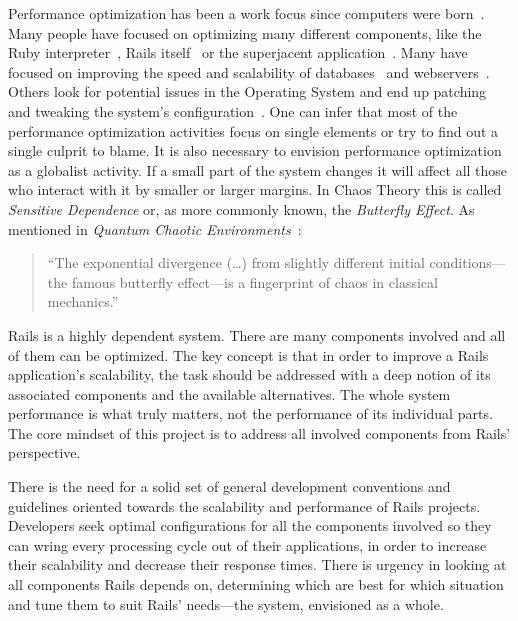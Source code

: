 Performance optimization has been a work focus since computers were born~\cite{mass_memory_system_optimization}. Many people have focused on optimizing many different components, like the Ruby interpreter~\cite{yarv}, Rails itself~\cite{rails_merb_merge_performance} or the superjacent application~\cite{scaling_rails_bottomup,vaporware_to_awesome,rebuilding_scaling_yellowpages,5tips_scale_ror}. Many have focused on improving the speed and scalability of databases~\cite{performance_analysis_db_arch} and webservers~\cite{webserver_scheduling}. Others look for potential issues in the Operating System and end up patching and tweaking the system's configuration~\cite{unix_os_comparison, architecture_impact_os}. One can infer that most of the performance optimization activities focus on single elements or try to find out a single culprit to blame. It is also necessary to envision performance optimization as a globalist activity. If a small part of the system changes it will affect all those who interact with it by smaller or larger margins. In Chaos Theory this is called \textit{Sensitive Dependence} or, as more commonly known, the \textit{Butterfly Effect}. As mentioned in \textit{Quantum Chaotic Environments}~\cite{butterfly_effect_quote}:
\begin{quote}
  ``The exponential divergence (\ldots) from slightly different initial conditions---the famous butterfly effect---is a fingerprint of chaos in classical mechanics.''
\end{quote}
Rails is a highly dependent system. There are many components involved and all of them can be optimized. The key concept is that in order to improve a Rails application's scalability, the task should be addressed with a deep notion of its associated components and the available alternatives. The whole system performance is what truly matters, not the performance of its individual parts. The core mindset of this project is to address all involved components from Rails' perspective.

There is the need for a solid set of general development conventions and guidelines oriented towards the scalability and performance of Rails projects. Developers seek optimal configurations for all the components involved so they can wring every processing cycle out of their applications, in order to increase their scalability and decrease their response times. There is urgency in looking at all components Rails depends on, determining which are best for which situation and tune them to suit Rails' needs---the system, envisioned as a whole.

